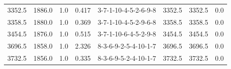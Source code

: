 \begin{tabular}{rrrrlrrr}
 3352.5 &  1886.0 &            1.0 &              0.417 &  3-7-1-10-4-5-2-6-9-8 &        3352.5 &          3352.5 &       0.0 \\
 3358.5 &  1880.0 &            1.0 &              0.369 &  3-7-1-10-4-5-2-9-6-8 &        3358.5 &          3358.5 &       0.0 \\
 3454.5 &  1876.0 &            1.0 &              0.515 &  3-7-1-10-6-4-5-2-9-8 &        3454.5 &          3454.5 &       0.0 \\
 3696.5 &  1858.0 &            1.0 &              2.326 &  8-3-6-9-2-5-4-10-1-7 &        3696.5 &          3696.5 &       0.0 \\
 3732.5 &  1856.0 &            1.0 &              0.335 &  8-3-6-9-5-2-4-10-1-7 &        3732.5 &          3732.5 &       0.0 \\
\bottomrule
\end{tabular}
